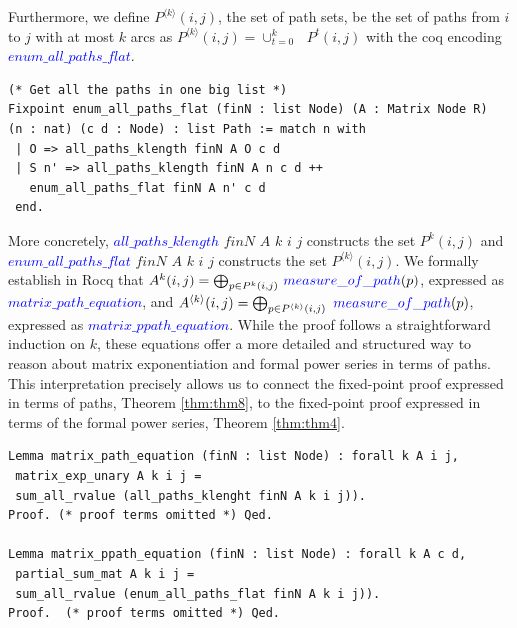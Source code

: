 \documentclass[a4paper,UKenglish,cleveref, autoref, thm-restate, anonymous]{lipics-v2021}
\begin{document}
Furthermore, we define $P^{\langle k \rangle}(i, j)$, the set of path sets,
be the set of paths from $i$ to $j$ with  at most $k$ arcs as 
$ P^{\langle k \rangle}(i, j) = \cup_{t = 0}^{k}\text{ } P^{t}(i, j)$ with the coq encoding 
\textcolor{blue}{$enum\_all\_paths\_flat$}.
\vspace{2mm}
\begin{lstlisting}[language=Coq]
(* Get all the paths in one big list *)
Fixpoint enum_all_paths_flat (finN : list Node) (A : Matrix Node R) 
(n : nat) (c d : Node) : list Path := match n with
 | O => all_paths_klength finN A O c d
 | S n' => all_paths_klength finN A n c d ++ 
   enum_all_paths_flat finN A n' c d
 end.
\end{lstlisting}
\label{fig:defpath}


More concretely, \textcolor{blue}{$all\_paths\_klength$}  $finN$ $A$ $k$  $i$  $j$ constructs the set $P^{k}(i, j)$
and \textcolor{blue}{$enum\_all\_paths\_flat$} $finN$ $A$ $k$  $i$  $j$ constructs the set $P^{\langle k \rangle}(i, j)$.
We formally establish in Rocq that $A^{k}(i, j) = \bigoplus_{p \in P^{k}(i, j)} \, \textcolor{blue}{measure\_of\_path}(p)$, expressed 
 as  \textcolor{blue}{$matrix\_path\_equation$}, and  
 $A^{\langle k \rangle}(i, j) = \bigoplus_{p \in P^{\langle k \rangle}(i, j)} \text{ } \textcolor{blue}{measure\_of\_path}(p)$, expressed as \textcolor{blue}{$matrix\_ppath\_equation$}. 
 While the proof follows a straightforward induction on $k$, these equations offer a more detailed and structured way to reason about matrix exponentiation and formal power series in terms of paths. This interpretation precisely allows us 
to connect the fixed-point proof expressed in terms of paths, Theorem \ref{thm:thm8}, 
 to the fixed-point proof expressed in terms of the formal power series, Theorem \ref{thm:thm4}.
 
 
 \begin{lstlisting}[language=Coq]
Lemma matrix_path_equation (finN : list Node) : forall k A i j,
 matrix_exp_unary A k i j = 
 sum_all_rvalue (all_paths_klenght finN A k i j)).
Proof. (* proof terms omitted *) Qed.

Lemma matrix_ppath_equation (finN : list Node) : forall k A c d,
 partial_sum_mat A k i j = 
 sum_all_rvalue (enum_all_paths_flat finN A k i j)). 
Proof.  (* proof terms omitted *) Qed. 
\end{lstlisting}
\end{document}
